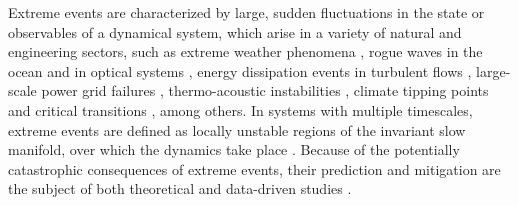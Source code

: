 \documentclass[aps,reprint,prx]{revtex4-2}
\begin{document}
Extreme events \cite{farazmandExtremeEventsMechanisms2019, ghilExtremeEventsDynamics2011} are characterized by large, sudden fluctuations in the state or observables of a dynamical system, which arise in a variety of natural and engineering sectors, such as extreme weather phenomena \cite{ropelewskiGlobalRegionalScale1987, easterlingObservedVariabilityTrends2000}, rogue waves in the ocean and in optical systems \cite{dystheOceanicRogueWaves2008, solliOpticalRogueWaves2007, sapsisStatisticsExtremeEvents2021}, energy dissipation events in turbulent flows \cite{yeungExtremeEventsComputational2015, bloniganAreExtremeDissipation2019}, large-scale power grid failures \cite{crucittiModelCascadingFailures2004, fangSmartGridNew2012}, thermo-acoustic instabilities \cite{huhnStabilitySensitivityOptimisation2020}, climate tipping points and critical transitions \cite{schefferEarlywarningSignalsCritical2009}, among others. In systems with multiple timescales, extreme events are defined as locally unstable regions of the invariant slow manifold, over which the dynamics take place \cite{schefferEarlywarningSignalsCritical2009, schefferAnticipatingCriticalTransitions2012, kuehnMathematicalFrameworkCritical2011, kuehnMultipleTimeScale2015, farazmandExtremeEventsMechanisms2019}. Because of the potentially catastrophic consequences of extreme events, their prediction and mitigation are the subject of both theoretical and data-driven studies \cite[e.g.,][]{dakosSlowingEarlyWarning2008, qiUsingMachineLearning2020, doan2021short, raccaDatadrivenPredictionControl2022a, farandaDynamicalProxiesNorth2017}.
\end{document}
